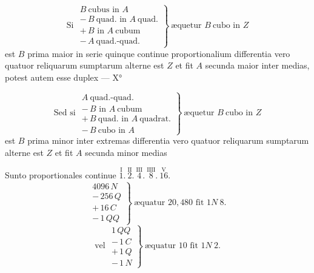 \documentclass[11pt,a4paper]{article}
\begin{document}
\[ \text{Si } \left.\begin{array}{l} B\ \text{cubus in } A \\ -\,B\ \text{quad. in } A\ \text{quad.} \\ +\,B \text{ in } A\ \text{cubum} \\ -\,A\ \text{quad.-quad.} \end{array}\right\}\ \text{æquetur } B\ \text{cubo in } Z \]
est $B$ prima maior in serie quinque continue proportionalium differentia vero quatuor reliquarum sumptarum alterne est $Z$ et fit $A$ secunda maior inter medias, potest autem esse duplex --- X°

\[ \text{Sed si } \left.\begin{array}{l} A\ \text{quad.-quad.} \\ -\,B \text{ in } A\ \text{cubum} \\ +\,B\ \text{quad. in } A\ \text{quadrat.} \\ -\,B\ \text{cubo in } A \end{array}\right\}\ \text{æquetur } B\ \text{cubo in } Z \]
est $B$ prima minor inter extremas differentia vero quatuor reliquarum sumptarum alterne est $Z$ et fit $A$ secunda minor   medias

Sunto proportionales continue $\overset{\text{I}}{1}.\ \overset{\text{II}}{2}.\ \overset{\text{III}}{4}.\ \overset{\text{IIII}}{8}.\ \overset{\text{V}}{16}.$
\[ \left.\begin{array}{l} 4096\,N \\ -\,256\,Q \\ +\,16\,C \\ -\,1\,QQ \end{array}\right\}\ \text{æquatur } 20{,}480 \text{ fit } 1N\ 8. \]
\[ \text{vel } \left.\begin{array}{l} 1\,QQ \\ -\,1\,C \\ +\,1\,Q \\ -\,1\,N \end{array}\right\}\ \text{æquatur } 10 \text{ fit } 1N\ 2. \]
\end{document}
